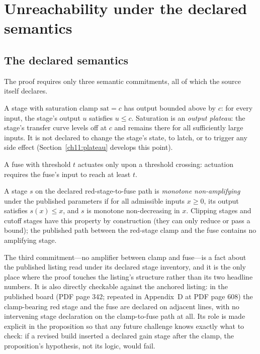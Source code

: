 \section{Unreachability under the declared semantics}\label{ch11:unreach}

\subsection{The declared semantics}

The proof requires only three semantic commitments, all of which the source itself declares.

\begin{definition}\label{ch11:def-clamp}
A stage with saturation clamp $\mathrm{sat}=c$ has output bounded above by $c$: for every input, the stage's output $u$ satisfies $u\le c$. Saturation is an \emph{output plateau}: the stage's transfer curve levels off at $c$ and remains there for all sufficiently large inputs. It is not declared to change the stage's state, to latch, or to trigger any side effect (Section~\ref{ch11:plateau} develops this point).
\end{definition}

\begin{definition}\label{ch11:def-threshold}
A fuse with threshold $t$ actuates only upon a threshold crossing: actuation requires the fuse's input to reach at least $t$.
\end{definition}

\begin{definition}\label{ch11:def-mono}
A stage $s$ on the declared red-stage-to-fuse path is \emph{monotone non-amplifying} under the published parameters if for all admissible inputs $x\ge 0$, its output satisfies $s(x)\le x$, and $s$ is monotone non-decreasing in $x$. Clipping stages and cutoff stages have this property by construction (they can only reduce or pass a bound); the published path between the red-stage clamp and the fuse contains no amplifying stage.
\end{definition}

The third commitment---no amplifier between clamp and fuse---is a fact about the published listing read under its declared stage inventory, and it is the only place where the proof touches the listing's structure rather than its two headline numbers. It is also directly checkable against the anchored listing: in the published board (PDF page 342; repeated in Appendix~D at PDF page 608) the clamp-bearing red stage and the fuse are declared on adjacent lines, with no intervening stage declaration on the clamp-to-fuse path at all. Its role is made explicit in the proposition so that any future challenge knows exactly what to check: if a revised build inserted a declared gain stage after the clamp, the proposition's hypothesis, not its logic, would fail.

